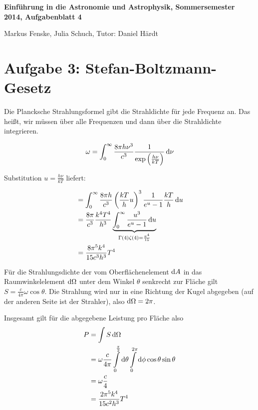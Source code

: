 \documentclass[a4paper,german,12pt,smallheadings]{scrartcl}
\begin{document}
\allowdisplaybreaks %
\begin{center}
\bfseries %
\sffamily %
\vspace{-40pt}
Einführung in die Astronomie und Astrophysik, Sommersemester 2014, Aufgabenblatt 4

Markus Fenske, Julia Schuch, Tutor: Daniel Härdt
\vspace{-10pt}
\end{center}
\section*{Aufgabe 3: Stefan-Boltzmann-Gesetz}

Die Plancksche Strahlungsformel gibt die Strahldichte für jede Frequenz an. Das
heißt, wir müssen über alle Frequenzen und dann über die Strahldichte integrieren.

\begin{align}
  \omega = \int_0^\infty \frac{8 \pi h \nu^3}{c^3} \frac{1}{\exp\del{\frac{h \nu}{k T}}} \dif \nu
\end{align}

Substitution $u = \frac{h \nu}{k T}$ liefert:

\begin{align}
  &= \int_0^\infty \frac{8 \pi h}{c^3} \del{ \frac{kT}{h} u}^3 \frac{1}{e^u - 1} \frac{kT}{h} \dif u \\
  &= \frac{8 \pi}{c^3} \frac{k^4 T^4}{h^3} \underbrace{\int_0^\infty \frac{u^3}{e^u - 1} \dif u}_{\mathclap{\Gamma(4) \zeta(4) = \frac{\pi^4}{15}}} \\
  &= \frac{8 \pi^5 k^4}{15 c^3 h^3} T^4
\end{align}

Für die Strahlungsdichte der vom Oberflächenelement $\dif A$ in das
Raumwinkelelement $\dif \Omega$ unter dem Winkel $\theta$ senkrecht zur Fläche
gilt $S = \frac{c}{4 \pi} \omega \cos \theta$. Die Strahlung wird nur in eine
Richtung der Kugel abgegeben (auf der anderen Seite ist der Strahler), also
$\dif \Omega = 2 \pi$.

Insgesamt gilt für die abgegebene Leistung pro Fläche also
\begin{align}
  P &= \int S \dif \Omega \\
    &= \omega \frac{c}{4 \pi} \int\limits_0^{\frac{\pi}{2}} \dif \theta \int\limits_0^{2 \pi} \dif \phi \cos \theta \sin \theta \\
    &= \omega \frac{c}{4} \\
    &= \frac{2 \pi^5 k^4}{15c^2h^3} T^4
\end{align}
\end{document}
